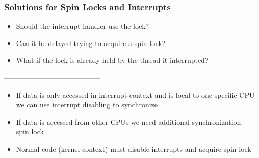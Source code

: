 \begin{frame}[fragile]
    \frametitle{Solutions for Spin Locks and Interrupts}
    \Large

        \begin{itemize}
            \item Should the interrupt handler use the lock?
            \item Can it be delayed trying to acquire a spin lock?
            \item What if the lock is already held by the thread it interrupted?           
        \end{itemize}
    -----------------------------------------
    \begin{itemize}
        \item If data is only accessed in interrupt context and is local to one
        specific CPU we can use interrupt disabling to synchronize
        
        \item If data is accessed from other CPUs we need additional
        synchronization -- spin lock
        
        \item Normal code (kernel context) must disable interrupts and
        acquire spin lock
        
    \end{itemize}

\end{frame}


